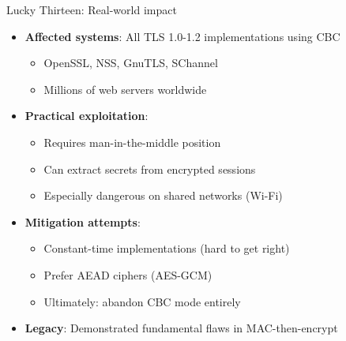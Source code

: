 \documentclass[aspectratio=169, lualatex, handout]{beamer}
\begin{document}
\begin{frame}{Lucky Thirteen: Real-world impact}
	\begin{itemize}[<+->]
		\item \textbf{Affected systems}: All TLS 1.0-1.2 implementations using CBC
		      \begin{itemize}
			      \item OpenSSL, NSS, GnuTLS, SChannel
			      \item Millions of web servers worldwide
		      \end{itemize}
		\item \textbf{Practical exploitation}:
		      \begin{itemize}
			      \item Requires man-in-the-middle position
			      \item Can extract secrets from encrypted sessions
			      \item Especially dangerous on shared networks (Wi-Fi)
		      \end{itemize}
		\item \textbf{Mitigation attempts}:
		      \begin{itemize}
			      \item Constant-time implementations (hard to get right)
			      \item Prefer AEAD ciphers (AES-GCM)
			      \item Ultimately: abandon CBC mode entirely
		      \end{itemize}
		\item \textbf{Legacy}: Demonstrated fundamental flaws in MAC-then-encrypt
	\end{itemize}
\end{frame}
\end{document}
